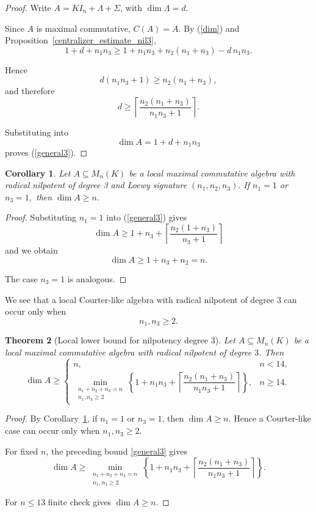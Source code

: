 \documentclass[11pt]{article}
\theoremstyle{remark}
\theoremstyle{plain}
\newtheorem{theorem}{Theorem}
\newtheorem{corollary}[theorem]{Corollary}
\theoremstyle{definition}
\theoremstyle{myremark}
\begin{document}
\begin{proof}
	Write \(A=KI_n+\Lambda+\Sigma\), with \(\dim\Lambda=d\).
	
	Since \(A\) is maximal commutative, \(C(A)=A\). By (\ref{dim}) and
	Proposition~\ref{centralizer_estimate_nil3},
	\[	1+d+n_1n_3	\ge	1+n_1n_3+n_2(n_1+n_3)-d\,n_1n_3.
	\]
	
	Hence
	\[
	d(n_1n_3+1)\ge n_2(n_1+n_3),
	\]
	and therefore
	\[
	d
	\ge
	\left\lceil
	\frac{n_2(n_1+n_3)}{n_1n_3+1}
	\right\rceil.
	\]
	
	Substituting into
	\[
	\dim A=1+d+n_1n_3
	\]
	proves (\ref{general3}).
\end{proof}\medskip




\begin{corollary}\label{n1_or_n3_one}
	Let $A\subseteq M_n(K)$
	be a local maximal commutative algebra with
radical nilpotent of degree 3 and Loewy signature	$(n_1,n_2,n_3).$
	If	$n_1=1$ or $n_3=1,$ then $\dim A\ge n.$
\end{corollary}

\begin{proof}
	Substituting \(n_1=1\) into (\ref{general3}) gives
	\[	\dim A	\ge	1+n_3+	\left\lceil	\frac{n_2(1+n_3)}{n_3+1}	\right\rceil
	\]
and we obtain
	\[	\dim A	\ge	1+n_3+n_2	=	n.\]
	
	The case \(n_3=1\) is analogous. 
\end{proof}\medskip


We see that a local Courter-like algebra with radical nilpotent of degree 3 can occur only when \[	n_1,n_3\ge2.\]
	

\begin{theorem}[Local lower bound for nilpotency degree \(3\)]
	\label{local_nil3_bound}
	Let	$A\subseteq M_n(K)$
	be a local maximal commutative algebra with radical nilpotent of degree \(3\).	Then
	\[
	\dim A\ge
	\begin{cases}
		n, & n<14,\\[2mm]	\displaystyle	\min_{\substack{n_1+n_2+n_3=n\\ n_1,n_3\ge2}}
		\left\{	1+n_1n_3+	\left\lceil	\dfrac{n_2(n_1+n_3)}{n_1n_3+1}	\right\rceil
		\right\}, & n\ge14.
	\end{cases}
	\]
\end{theorem}

\begin{proof}
	By Corollary~\ref{n1_or_n3_one}, if \(n_1=1\) or \(n_3=1\), then
	\(\dim A\ge n\). Hence a Courter-like case can occur only when
	\(n_1,n_3\ge 2\).
	
	For fixed \(n\), the preceding bound \eqref{general3} gives
	\[
	\dim A\ge
	\min_{\substack{n_1+n_2+n_3=n\\ n_1,n_3\ge2}}
	\left\{
	1+n_1n_3+
	\left\lceil
	\dfrac{n_2(n_1+n_3)}{n_1n_3+1}
	\right\rceil
	\right\}.
	\]
	
	For $n\leq 13$ finite check gives $\dim A\geq n$.
\end{proof}
\end{document}

